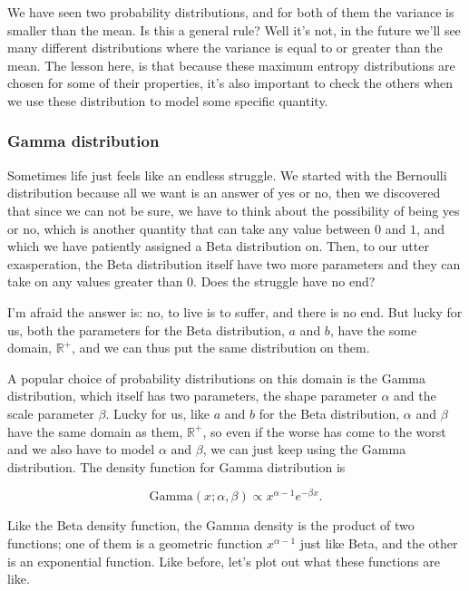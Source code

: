 \documentclass[11pt]{article}
\begin{document}
We have seen two probability distributions, and for both of them the variance is smaller than the mean. Is this a general rule? Well it's not, in the future we'll see many different distributions where the variance is equal to or greater than the mean. The lesson here, is that because these maximum entropy distributions are chosen for some of their properties, it's also important to check the others when we use these distribution to model some specific quantity.

\subsubsection{Gamma distribution}
\label{sec:org71565f2}

Sometimes life just feels like an endless struggle. We started with the Bernoulli distribution because all we want is an answer of yes or no, then we discovered that since we can not be sure, we have to think about the possibility of being yes or no, which is another quantity that can take any value between \(0\) and \(1\), and which we have patiently assigned a Beta distribution on. Then, to our utter exasperation, the Beta distribution itself have two more parameters and they can take on any values greater than 0. Does the struggle have no end?

I'm afraid the answer is: no, to live is to suffer, and there is no end. But lucky for us, both the parameters for the Beta distribution, \(a\) and \(b\), have the some domain, \(\mathbb{R}^+\), and we can thus put the same distribution on them.

A popular choice of probability distributions on this domain is the Gamma distribution, which itself has two parameters, the shape parameter \(\alpha\) and the scale parameter \(\beta\). Lucky for us, like \(a\) and \(b\) for the Beta distribution, \(\alpha\) and \(\beta\) have the same domain as them, \(\mathbb{R}^+\), so even if the worse has come to the worst and we also have to model \(\alpha\) and \(\beta\), we can just keep using the Gamma distribution. The density function for Gamma distribution is

$$\text{Gamma}(x; \alpha, \beta) \propto x^{\alpha-1} e^{-\beta x}. $$

Like the Beta density function, the Gamma density is the product of two functions; one of them is a geometric function \(x^{\alpha-1}\) just like Beta, and the other is an exponential function. Like before, let's plot out what these functions are like.
\end{document}
